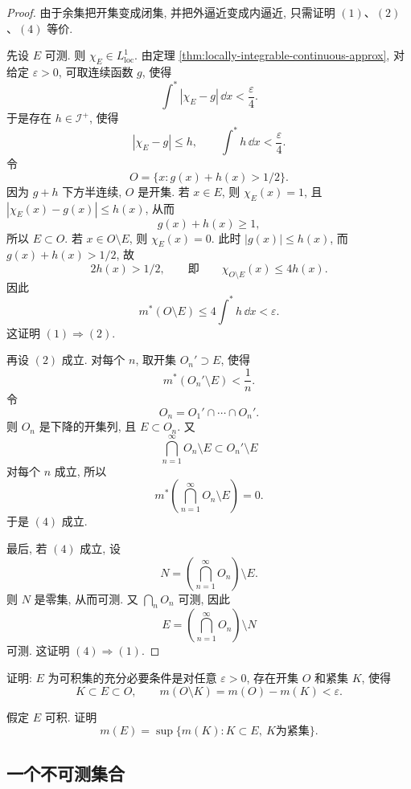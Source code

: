 \begin{proof}
	由于余集把开集变成闭集, 并把外逼近变成内逼近, 只需证明 \((1)\)、\((2)\)、\((4)\) 等价.
	
	先设 \(E\) 可测. 则 \(\chi_E\in L^1_{\operatorname{loc}}\). 由定理 \ref{thm:locally-integrable-continuous-approx}, 对给定 \(\varepsilon>0\), 可取连续函数 \(g\), 使得
	\[
	\int^*|\chi_E-g|\,\dd x<\frac{\varepsilon}{4}.
	\]
	于是存在 \(h\in\mathcal I^+\), 使得
	\[
	|\chi_E-g|\leq h,
	\qquad
	\int^*h\,\dd x<\frac{\varepsilon}{4}.
	\]
	令
	\[
	O=\{x:g(x)+h(x)>1/2\}.
	\]
	因为 \(g+h\) 下方半连续, \(O\) 是开集. 若 \(x\in E\), 则 \(\chi_E(x)=1\), 且 \(|\chi_E(x)-g(x)|\leq h(x)\), 从而
	\[
	g(x)+h(x)\geq1,
	\]
	所以 \(E\subset O\).
	若 \(x\in O\setminus E\), 则 \(\chi_E(x)=0\). 此时 \(|g(x)|\leq h(x)\), 而 \(g(x)+h(x)>1/2\), 故
	\[
	2h(x)>1/2,
	\qquad
	\text{即}\qquad
	\chi_{O\setminus E}(x)\leq4h(x).
	\]
	因此
	\[
	m^*(O\setminus E)
	\leq4\int^*h\,\dd x<\varepsilon.
	\]
	这证明 \((1)\Rightarrow(2)\).
	
	再设 \((2)\) 成立. 对每个 \(n\), 取开集 \(O_n'\supset E\), 使得
	\[
	m^*(O_n'\setminus E)<\frac1n.
	\]
	令
	\[
	O_n=O_1'\cap\cdots\cap O_n'.
	\]
	则 \(O_n\) 是下降的开集列, 且 \(E\subset O_n\). 又
	\[
	\bigcap_{n=1}^{\infty}O_n\setminus E
	\subset O_n'\setminus E
	\]
	对每个 \(n\) 成立, 所以
	\[
	m^*\left(\bigcap_{n=1}^{\infty}O_n\setminus E\right)=0.
	\]
	于是 \((4)\) 成立.
	
	最后, 若 \((4)\) 成立, 设
	\[
	N=\left(\bigcap_{n=1}^{\infty}O_n\right)\setminus E.
	\]
	则 \(N\) 是零集, 从而可测. 又 \(\bigcap_nO_n\) 可测, 因此
	\[
	E=\left(\bigcap_{n=1}^{\infty}O_n\right)\setminus N
	\]
	可测. 这证明 \((4)\Rightarrow(1)\).
\end{proof}

\begin{exer}\label{exer:integrable-set-open-compact-approx}
	证明: \(E\) 为可积集的充分必要条件是对任意 \(\varepsilon>0\), 存在开集 \(O\) 和紧集 \(K\), 使得
	\[
	K\subset E\subset O,
	\qquad
	m(O\setminus K)=m(O)-m(K)<\varepsilon.
	\]
\end{exer}

\begin{exer}\label{exer:integrable-measure-inner-regular}
	假定 \(E\) 可积. 证明
	\[
	m(E)=\sup\{m(K):K\subset E,\ K\text{为紧集}\}.
	\]
\end{exer}

\subsection{一个不可测集合}


